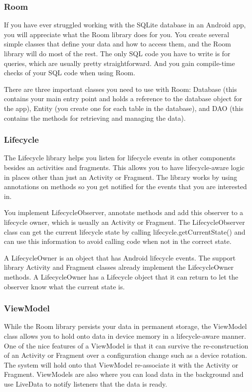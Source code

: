 \documentclass[a4paper, 12pt]{article}
\begin{document}
\subsubsection{Room}
If you have ever struggled working with the SQLite database in an Android app, you will appreciate what the Room library does for you. You create several simple classes that define your data and how to access them, and the Room library will do most of the rest. The only SQL code you have to write is for queries, which are usually pretty straightforward. And you gain compile-time checks of your SQL code when using Room.

There are three important classes you need to use with Room: Database (this contains your main entry point and holds a reference to the database object for the app), Entity (you create one for each table in the database), and DAO (this contains the methods for retrieving and managing the data).

\subsubsection{Lifecycle}
The Lifecycle library helps you listen for lifecycle events in other components besides an activities and fragments. This allows you to have lifecycle-aware logic in places other than just an Activity or Fragment. The library works by using annotations on methods so you get notified for the events that you are interested in.

You implement LifecycleObserver, annotate methods and add this observer to a lifecycle owner, which is usually an Activity or Fragment. The LifecycleObserver class can get the current lifecycle state by calling lifecycle.getCurrentState() and can use this information to avoid calling code when not in the correct state.

A LifecycleOwner is an object that has Android lifecycle events. The support library Activity and Fragment classes already implement the LifecycleOwner methods. A LifecycleOwner has a Lifecycle object that it can return to let the observer know what the current state is.
\subsubsection{ViewModel}
While the Room library persists your data in permanent storage, the ViewModel class allows you to hold onto data in device memory in a lifecycle-aware manner. One of the nice features of a ViewModel is that it can survive the re-construction of an Activity or Fragment over a configuration change such as a device rotation. The system will hold onto that ViewModel re-associate it with the Activity or Fragment. ViewModels are also where you can load data in the background and use LiveData to notify listeners that the data is ready.
\end{document}
